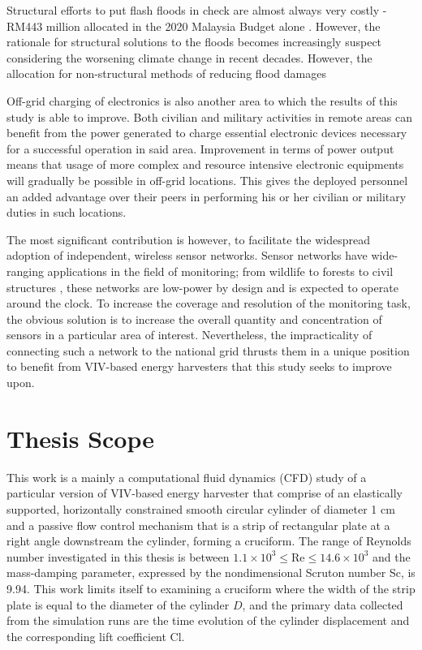 \documentclass[oneside]{utmthesis}
\begin{document}
Structural efforts to put flash floods in check are almost always very costly - RM443 million allocated in the 2020 Malaysia Budget alone \citep{KementerianKewanganMalaysia2019}. However, the rationale for structural solutions to the floods becomes increasingly suspect considering the worsening climate change in recent decades. However, the allocation for non-structural methods of reducing flood damages

Off-grid charging of electronics is also another area to which the results of this study is able to improve. Both civilian and military activities in remote areas can benefit from the power generated to charge essential electronic devices necessary for a successful operation in said area. Improvement in terms of power output means that usage of more complex and resource intensive electronic equipments will gradually be possible in off-grid locations. This gives the deployed personnel an added advantage over their peers in performing his or her civilian or military duties in such locations.

The most significant contribution is however, to facilitate the widespread adoption of independent, wireless sensor networks. Sensor networks have wide-ranging applications in the field of monitoring; from wildlife \citep{Gazis2020,Pathak2020} to forests \citep{Kadir2019,Zellweger2019} to civil structures \citep{Ni2020,SadeghiEshkevari2020,Mao2020}, these networks are low-power by design and is expected to operate around the clock. To increase the coverage and resolution of the monitoring task, the obvious solution is to increase the overall quantity and concentration of sensors in a particular area of interest. Nevertheless, the impracticality of connecting such a network to the national grid thrusts them in a unique position to benefit from VIV-based energy harvesters that this study seeks to improve upon.

\section{Thesis Scope}
This work is a mainly a computational fluid dynamics (CFD) study of a particular version of VIV-based energy harvester that comprise of an elastically supported, horizontally constrained smooth circular cylinder of diameter 1 cm and a passive flow control mechanism that is a strip of rectangular plate at a right angle downstream the cylinder, forming a cruciform. The range of Reynolds number investigated in this thesis is between $1.1 \times 10^{3} \leq \text{Re} \leq 14.6 \times 10^{3}$ and the mass-damping parameter, expressed by the nondimensional Scruton number Sc, is 9.94. This work limits itself to examining a cruciform where the width of the strip plate is equal to the diameter of the cylinder $D$, and the primary data collected from the simulation runs are the time evolution of the cylinder displacement and the corresponding lift coefficient Cl.
\end{document}
